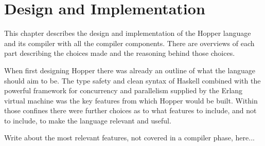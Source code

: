 \chapter{Design and Implementation}


This chapter describes the design and implementation of the Hopper language and its compiler with all the compiler components. There are overviews of each part describing the choices made and the reasoning behind those choices.

When first designing Hopper there was already an outline of what the language should aim to be. The type safety and clean syntax of Haskell combined with the powerful framework for concurrency and parallelism supplied by the Erlang virtual machine was the key features from which Hopper would be built. Within those confines there were further choices as to what features to include, and not to include, to make the language relevant and useful.


Write about the most relevant features, not covered in a compiler phase, here...







